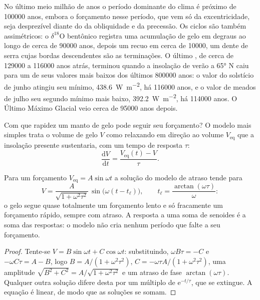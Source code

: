 No último meio milhão de anos o período dominante do clima é próximo de \num{100000} anos,
embora o forçamento nesse período, que vem só da excentricidade, seja desprezível
diante do da obliquidade e da precessão. Os ciclos são também assimétricos: o $\delta^{18}$O bentônico
registra uma acumulação de gelo em degraus ao longo de cerca de \num{90000} anos, depois um recuo em cerca de
\num{10000}, um dente de serra cujas bordas descendentes são as terminações. O último , de
cerca de \num{129000} a \num{116000} anos atrás, terminou quando a insolação de verão a \ang{65} N caiu
para um de seus valores mais baixos dos últimos \num{800000} anos: o valor do solstício de junho atingiu seu
mínimo, \qty{438.6}{W.m^{-2}}, há \num{116000} anos, e o valor de meados de julho seu segundo mínimo mais baixo,
\qty{392.2}{W.m^{-2}}, há \num{114000} anos. O Último Máximo Glacial veio cerca de
\num{95000} anos depois.

Com que rapidez um manto de gelo pode seguir seu forçamento? O modelo mais simples trata o volume de gelo $V$ como
relaxando em direção ao volume $V_{\mathrm{eq}}$ que a insolação presente sustentaria, com um
tempo de resposta $\tau$:
\[
  \frac{\mathrm dV}{\mathrm dt} = \frac{V_{\mathrm{eq}}(t) - V}{\tau} .
\]

\begin{proposition}\label{prop:b2:orbital-forcing:lag}
Para um forçamento $V_{\mathrm{eq}} = A\sin\omega t$ a solução do modelo de atraso tende para
\[
  V = \frac{A}{\sqrt{1 + \omega^2\tau^2}}\,\sin\bigl(\omega(t - t_{\ell})\bigr),\qquad
  t_{\ell} = \frac{\arctan(\omega\tau)}{\omega} :
\]
o gelo segue quase totalmente um forçamento lento e só fracamente um forçamento rápido, sempre com atraso. A resposta
a uma soma de senoides é a soma das respostas: o modelo não cria nenhum período que falte a seu
forçamento.
\end{proposition}

\begin{proof}
Tente-se $V = B\sin\omega t + C\cos\omega t$: substituindo, $\omega B\tau = -C$ e $-\omega C\tau = A -
B$, logo $B = A/(1 + \omega^2\tau^2)$, $C = -\omega\tau A/(1 + \omega^2\tau^2)$, uma amplitude
$\sqrt{B^2 + C^2} = A/\sqrt{1 + \omega^2\tau^2}$ e um atraso de fase $\arctan(\omega\tau)$. Qualquer outra
solução difere desta por um múltiplo de $\mathrm e^{-t/\tau}$, que se extingue. A
equação é linear, de modo que as soluções se somam.
\end{proof}

